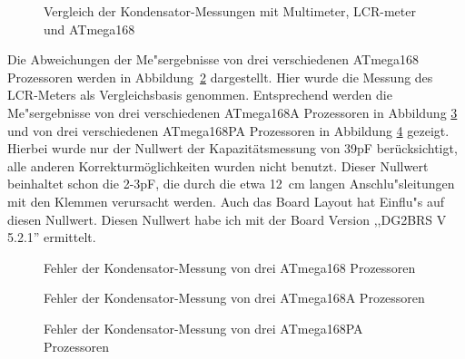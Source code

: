 \begin{figure}[H]
\centering

\caption{Vergleich der Kondensator-Messungen mit Multimeter, LCR-meter und ATmega168}
\label{fig:capcompare}
\end{figure}

Die Abweichungen der Me"sergebnisse von drei verschiedenen ATmega168 Prozessoren werden in Abbildung~\ref{fig:mega168all} dargestellt.
Hier wurde die Messung des LCR-Meters als Vergleichsbasis genommen.
Entsprechend werden die Me"sergebnisse von drei verschiedenen ATmega168A Prozessoren in Abbildung \ref{fig:mega168Aall} und
von drei verschiedenen ATmega168PA Prozessoren in Abbildung \ref{fig:mega168PAall} gezeigt.
Hierbei wurde nur der Nullwert der Kapazit\"atsmessung von 39pF ber\"ucksichtigt, alle anderen Korrekturm\"oglichkeiten wurden
nicht benutzt. Dieser Nullwert beinhaltet schon die 2-3pF, die durch die etwa 12~cm langen Anschlu"sleitungen mit den
Klemmen verursacht werden.
Auch das Board Layout hat Einflu"s auf diesen Nullwert. Diesen Nullwert habe ich mit der Board Version ,,DG2BRS V 5.2.1'' ermittelt.

\begin{figure}[H]
\centering

\caption{Fehler der Kondensator-Messung von drei ATmega168 Prozessoren}
\label{fig:mega168all}
\end{figure}

\begin{figure}[H]
\centering

\caption{Fehler der Kondensator-Messung von drei ATmega168A Prozessoren}
\label{fig:mega168Aall}
\end{figure}

\begin{figure}[H]
\centering

\caption{Fehler der Kondensator-Messung von drei ATmega168PA Prozessoren}
\label{fig:mega168PAall}
\end{figure}

